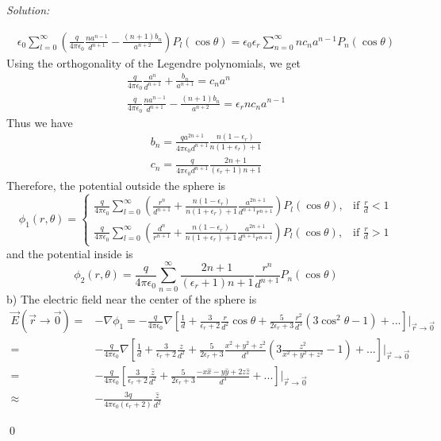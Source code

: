 \documentclass[12pt]{article}
\newenvironment{sol}
    {\emph{Solution:}
    }
    {
    \qed
    }
\begin{document}
\begin{sol}
\begin{gather*}
\epsilon_0\sum_{l=0}^{\infty}(\frac{q}{4\pi\epsilon_0}\frac{na^{n-1}}{d^{n+1}}-\frac{(n+1)b_n}{a^{n+2}})P_l(\cos\theta)=\epsilon_0\epsilon_r\sum_{n=0}^{\infty}nc_na^{n-1}P_n(\cos\theta)
\end{gather*}
Using the orthogonality of the Legendre polynomials, we get
\begin{gather*}
\frac{q}{4\pi\epsilon_0}\frac{a^n}{d^{n+1}}+\frac{b_n}{a^{n+1}}=c_na^n\\
\frac{q}{4\pi\epsilon_0}\frac{na^{n-1}}{d^{n+1}}-\frac{(n+1)b_n}{a^{n+2}}=\epsilon_rnc_na^{n-1}
\end{gather*}
Thus we have
\begin{gather*}
b_n=\frac{qa^{2n+1}}{4\pi\epsilon_0d^{n+1}}\frac{n(1-\epsilon_r)}{n(1+\epsilon_r)+1}\\
c_n=\frac{q}{4\pi\epsilon_0d^{n+1}}\frac{2n+1}{(\epsilon_r+1)n+1}
\end{gather*}
Therefore, the potential outside the sphere is
\[
\phi_1(r,\theta)=\left\{\begin{array}{ll}
\frac{q}{4\pi\epsilon_0}\sum_{l=0}^{\infty}(\frac{r^n}{d^{n+1}}+\frac{n(1-\epsilon_r)}{n(1+\epsilon_r)+1}\frac{a^{2n+1}}{d^{n+1}r^{n+1}})P_l(\cos\theta),&\text{if }\frac{r}{d}<1\\
\frac{q}{4\pi\epsilon_0}\sum_{l=0}^{\infty}(\frac{d^n}{r^{n+1}}+\frac{n(1-\epsilon_r)}{n(1+\epsilon_r)+1}\frac{a^{2n+1}}{d^{n+1}r^{n+1}})P_l(\cos\theta),&\text{if }\frac{r}{d}>1
\end{array}\right.
\]
and the potential inside is
\[
\phi_2(r,\theta)=\frac{q}{4\pi\epsilon_0}\sum_{n=0}^{\infty}\frac{2n+1}{(\epsilon_r+1)n+1}\frac{r^n}{d^{n+1}}P_n(\cos\theta)
\]
b) The electric field near the center of the sphere is
\begin{align*}
\vec{E}(\vec{r}\to\vec{0})=&-\nabla\phi_1=-\frac{q}{4\pi\epsilon_0}\nabla[\frac{1}{d}+\frac{3}{\epsilon_r+2}\frac{r}{d^2}\cos\theta+\frac{5}{2\epsilon_r+3}\frac{r^2}{d^3}(3\cos^2\theta-1)+...]|_{\vec{r}\to\vec{0}}\\
=&-\frac{q}{4\pi\epsilon_0}\nabla[\frac{1}{d}+\frac{3}{\epsilon_r+2}\frac{z}{d^2}+\frac{5}{2\epsilon_r+3}\frac{x^2+y^2+z^2}{d^3}(3\frac{z^2}{x^2+y^2+z^2}-1)+...]|_{\vec{r}\to\vec{0}}\\
=&-\frac{q}{4\pi\epsilon_0}[\frac{3}{\epsilon_r+2}\frac{\hat{z}}{d^2}+\frac{5}{2\epsilon_r+3}\frac{-x\hat{x}-y\hat{y}+2z\hat{z}}{d^3}+...]|_{\vec{r}\to\vec{0}}\\
\approx&-\frac{3q}{4\pi\epsilon_0(\epsilon_r+2)}\frac{\hat{z}}{d^2}
\end{align*}

\end{sol}
\end{document}
